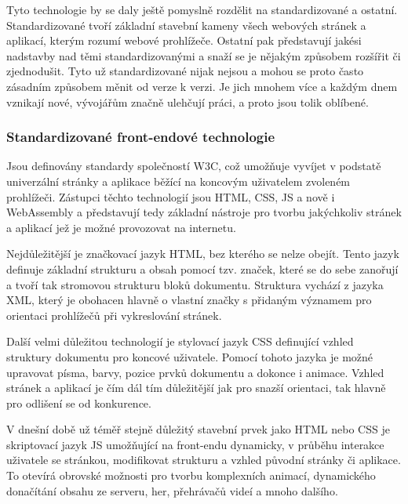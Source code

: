 	Tyto technologie by se daly ještě pomyslně rozdělit na standardizované a ostatní.
	Standardizované tvoří základní stavební kameny všech webových stránek a aplikací, kterým rozumí webové
	prohlížeče.
	Ostatní pak představují jakési nadstavby nad těmi standardizovanými a snaží se je nějakým způsobem rozšířit
	či zjednodušit.
	Tyto už standardizované nijak nejsou a mohou se proto často zásadním způsobem měnit od verze k verzi.
	Je jich mnohem více a každým dnem vznikají nové, vývojářům značně ulehčují práci, a proto jsou tolik oblíbené.

		\subsubsection{Standardizované front-endové technologie}

		Jsou definovány standardy společností W3C, což umožňuje vyvíjet v podstatě univerzální stránky a aplikace běžící na
		koncovým uživatelem zvoleném prohlížeči.
		Zástupci těchto technologií jsou HTML, CSS, \ac{JS} a nově i WebAssembly a představují tedy základní
		nástroje pro tvorbu jakýchkoliv stránek a aplikací jež je možné provozovat na internetu. \cite{w3c_webdesign}

		Nejdůležitější je značkovací jazyk \noindent\Ac{HTML}, bez kterého se nelze obejít.
		Tento jazyk definuje základní strukturu a obsah pomocí tzv. značek, které se do sebe zanořují a
		tvoří tak stromovou strukturu bloků dokumentu.
		Struktura vychází z jazyka \noindent\Ac{XML}, který je obohacen hlavně
		o vlastní značky s přidaným významem pro orientaci prohlížečů při vykreslování stránek. \cite{html_hypertext_markup_language}
		
		Další velmi důležitou technologií je stylovací jazyk \noindent\Ac{CSS} definující vzhled struktury
		dokumentu pro koncové uživatele.
		Pomocí tohoto jazyka je možné upravovat písma, barvy, pozice prvků dokumentu a dokonce i animace.
		Vzhled stránek a aplikací je čím dál tím důležitější jak pro snazší orientaci, tak hlavně pro odlišení se od konkurence.
		\cite{css_cascading_style_sheets}
		
		V dnešní době už téměř stejně důležitý stavební prvek jako \Ac{HTML} nebo \Ac{CSS} je skriptovací jazyk \ac{JS}
		umožňující na front-endu dynamicky, v průběhu interakce uživatele se stránkou, modifikovat strukturu a vzhled
		původní stránky či aplikace.
		To otevírá obrovské možnosti pro tvorbu komplexních animací, dynamického donačítání obsahu ze serveru, her, přehrávačů
		videí a mnoho dalšího. \cite{what_is_javascript}

